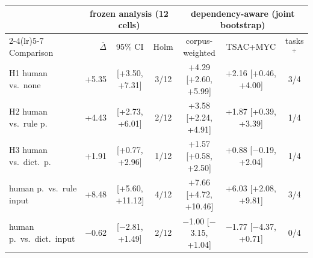 \begin{tabular}{l r c c c c c}
\toprule
 & \multicolumn{3}{c}{frozen analysis (12 cells)} & \multicolumn{3}{c}{dependency-aware (joint bootstrap)} \\
\cmidrule(lr){2-4}\cmidrule(lr){5-7}
Comparison & $\bar\Delta$ & 95\% CI & Holm & corpus-weighted & TSAC+MYC & tasks$^{+}$ \\
\midrule
H1 human vs.\ none & +5.35 & [+3.50, +7.31] & 3/12 & +4.29 [+2.60, +5.99] & +2.16 [+0.46, +4.00] & 3/4 \\
H2 human vs.\ rule p. & +4.43 & [+2.73, +6.01] & 2/12 & +3.58 [+2.24, +4.91] & +1.87 [+0.39, +3.39] & 1/4 \\
H3 human vs.\ dict.\ p. & +1.91 & [+0.77, +2.96] & 1/12 & +1.57 [+0.58, +2.50] & +0.88 [$-$0.19, +2.04] & 1/4 \\
\midrule
human p.\ vs.\ rule input & +8.48 & [+5.60, +11.12] & 4/12 & +7.66 [+4.72, +10.46] & +6.03 [+2.08, +9.81] & 3/4 \\
human p.\ vs.\ dict.\ input & $-$0.62 & [$-$2.81, +1.49] & 2/12 & $-$1.00 [$-$3.15, +1.04] & $-$1.77 [$-$4.37, +0.71] & 0/4 \\
\bottomrule
\end{tabular}
